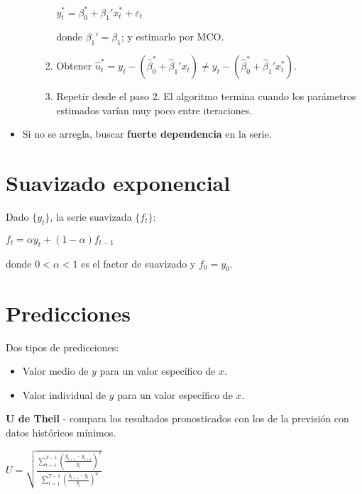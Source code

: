 \documentclass[10pt, a4paper, landscape]{article}
\begin{document}
\begin{multicols}{3}
\begin{itemize}[leftmargin=*]
\begin{itemize}[leftmargin=*]
\begin{enumerate}[leftmargin=*]
\begin{center}
				\( y_{t}^{*} = \beta_{0}^{*} + \beta_{1}' x_{t}^{*} + \varepsilon_{t} \)
			\end{center}
			donde \( \beta_{1}' = \beta_{1} \); y estimarlo por MCO.
			\item Obtener \( \hat{u}_{t}^{*} = y_{t} - (\hat{\beta}_{0}^{*} + \hat{\beta}_{1}' x_{t}) \neq y_{t} - (\hat{\beta}_{0}^{*} + \hat{\beta}_{1}' x_{t}^{*}) \).
			\item Repetir desde el paso 2. El algoritmo termina cuando los parámetros estimados varían muy poco entre iteraciones.
		\end{enumerate}
	\end{itemize}
	\item Si no se arregla, buscar \textbf{fuerte dependencia} en la serie.
\end{itemize}

\section*{Suavizado exponencial}

Dado \( \{ y_{t} \} \), la serie suavizada \( \{ f_{t} \} \):

\begin{center}
	\( f_{t} = \alpha y_{t} + (1 - \alpha) f_{t - 1} \)
\end{center}

donde \( 0 < \alpha < 1 \) es el factor de suavizado y \( f_{0} = y_{0} \).

\section*{Predicciones}

Dos tipos de predicciones:

\begin{itemize}[leftmargin=*]
	\item Valor medio de \( y \) para un valor específico de \( x \).
	\item Valor individual de \( y \) para un valor específico de \( x \).
\end{itemize}

\textbf{U de Theil} - compara los resultados pronosticados con los de la previsión con datos históricos mínimos.

\begin{center}
	\( U = \sqrt{\frac{\sum_{t = 1}^{T - 1} \left( \frac{\hat{y}_{t + 1} - y_{t + 1}}{y_{t}} \right)^{2}}{\sum_{t = 1}^{T - 1} \left( \frac{y_{t + 1} - y_{t}}{y_{t}} \right)^{2}}} \)
\end{center}


\end{multicols}
\end{document}
